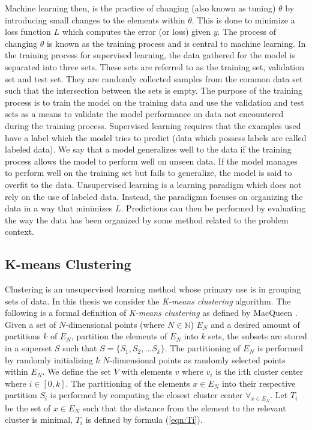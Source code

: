 Machine learning then, is the practice of changing (also known as tuning) $\theta$ by introducing small changes to the elements within $\theta$. This is done to minimize a loss function $L$ which computes the error (or loss) given $y$. The process of changing $\theta$ is known as the training process and is central to machine learning. In the training process for supervised learning, the data gathered for the model is separated into three sets. These sets are referred to as the training set, validation set and test set. They are randomly collected samples from the common data set such that the intersection between the sets is empty. The purpose of the training process is to train the model on the training data and use the validation and test sets as a means to validate the model performance on data not encountered during the training process. Supervised learning requires that the examples used have a label which the model tries to predict (data which possess labels are called labeled data). We say that a model generalizes well to the data if the training process allows the model to perform well on unseen data. If the model manages to perform well on the training set but fails to generalize, the model is said to overfit to the data. Unsupervised learning is a learning paradigm which does not rely on the use of labeled data. Instead, the paradigmn focuses on organizing the data in a way that minimizes $L$. Predictions can then be performed by evaluating the way the data has been organized by some method related to the problem context.


\subsection{K-means Clustering}

Clustering is an unsupervised learning method whose primary use is in grouping sets of data. In this thesis we consider the \textit{K-means clustering} algorithm. The following is a formal definition of \textit{K-means clustering} as defined by MacQueen \cite{macqueen}. Given a set of $N$-dimensional points (where $N \in \mathbb{N}$) $E_N$ and a desired amount of partitions $k$ of $E_N$, partition the elements of $E_N$ into $k$ sets, the subsets are stored in a superset $S$ such that $S = \{S_1, S_2, ... S_k\}$. The partitioning of $E_N$ is performed by randomly initializing $k$  $N$-dimensional points as randomly selected points within $E_N$. We define the set $V$ with elements $v$ where $v_i$ is the i:th cluster center where $i \in [0, k]$. The partitioning of the elements $x \in E_N$ into their respective partition $S_i$ is performed by computing the closest cluster center $\forall_{x \in E_N}$. Let $T_i$ be the set of $x \in E_N$ such that the distance from the element to the relevant cluster is minimal, $T_i$ is defined by formula (\ref{eqn:Ti}).

